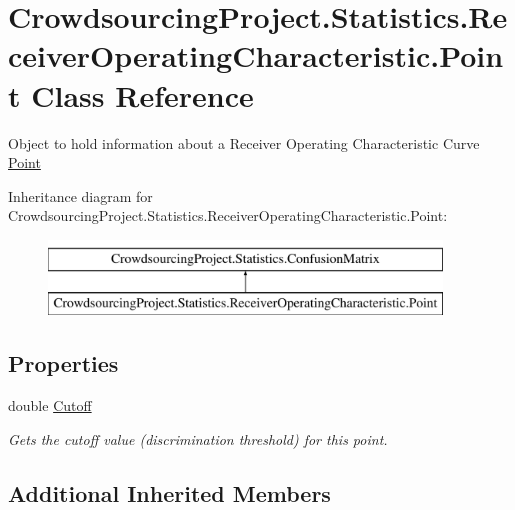 \hypertarget{class_crowdsourcing_project_1_1_statistics_1_1_receiver_operating_characteristic_1_1_point}{}\section{Crowdsourcing\+Project.\+Statistics.\+Receiver\+Operating\+Characteristic.\+Point Class Reference}
\label{class_crowdsourcing_project_1_1_statistics_1_1_receiver_operating_characteristic_1_1_point}


Object to hold information about a Receiver Operating Characteristic Curve \hyperlink{class_crowdsourcing_project_1_1_statistics_1_1_receiver_operating_characteristic_1_1_point}{Point}  


Inheritance diagram for Crowdsourcing\+Project.\+Statistics.\+Receiver\+Operating\+Characteristic.\+Point\+:\begin{figure}[H]
\begin{center}
\leavevmode
\includegraphics[height=2.000000cm]{class_crowdsourcing_project_1_1_statistics_1_1_receiver_operating_characteristic_1_1_point}
\end{center}
\end{figure}
\subsection*{Properties}
\begin{DoxyCompactItemize}
\item 
double \hyperlink{class_crowdsourcing_project_1_1_statistics_1_1_receiver_operating_characteristic_1_1_point_aba21bd4e1ac0f108580c8387eb8a933d}{Cutoff}
\begin{DoxyCompactList}\small\item\em Gets the cutoff value (discrimination threshold) for this point. \end{DoxyCompactList}\end{DoxyCompactItemize}
\subsection*{Additional Inherited Members}


